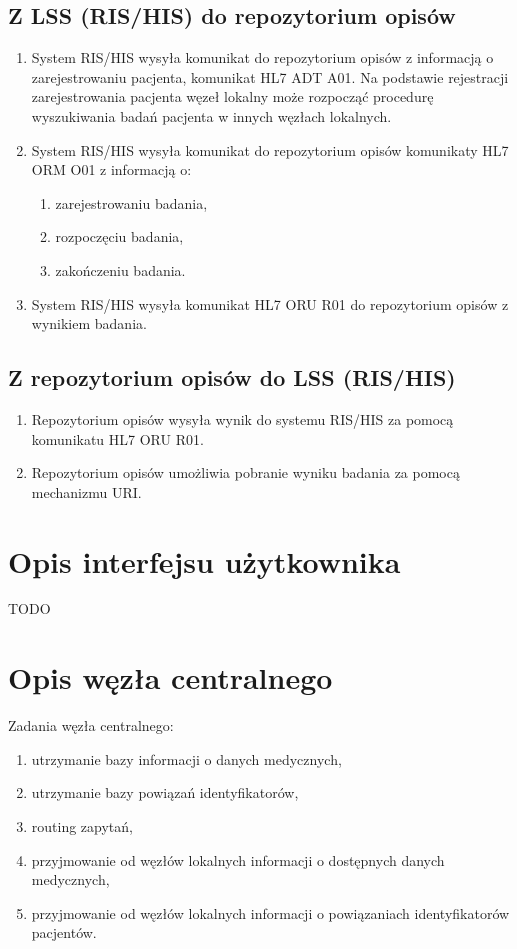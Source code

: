 \documentclass[a4paper]{report}
\begin{document}
\subsection{Z LSS (RIS/HIS) do repozytorium opisów}

\begin{enumerate}
  \item System RIS/HIS wysyła komunikat do repozytorium opisów z informacją o zarejestrowaniu pacjenta, komunikat HL7 ADT A01. Na podstawie rejestracji zarejestrowania pacjenta węzeł lokalny może rozpocząć procedurę wyszukiwania badań pacjenta w innych węzłach lokalnych.
  \item System RIS/HIS wysyła komunikat do repozytorium opisów komunikaty HL7 ORM O01 z informacją o:
    \begin{enumerate}
      \item zarejestrowaniu badania,
      \item rozpoczęciu badania,
      \item zakończeniu badania.
    \end{enumerate}
  \item System RIS/HIS wysyła komunikat HL7 ORU R01 do repozytorium opisów z wynikiem badania.
\end{enumerate}

\subsection{Z repozytorium opisów do LSS (RIS/HIS)}

\begin{enumerate}
  \item Repozytorium opisów wysyła wynik do systemu RIS/HIS za pomocą komunikatu HL7 ORU R01.
  \item Repozytorium opisów umożliwia pobranie wyniku badania za pomocą mechanizmu URI.
\end{enumerate}


\section{Opis interfejsu użytkownika}

TODO

\section{Opis węzła centralnego}

Zadania węzła centralnego:
  \begin{enumerate}
    \item utrzymanie bazy informacji o danych medycznych,
    \item utrzymanie bazy powiązań identyfikatorów,
    \item routing zapytań,
    \item przyjmowanie od węzłów lokalnych informacji o dostępnych danych medycznych,
    \item przyjmowanie od węzłów lokalnych informacji o powiązaniach identyfikatorów pacjentów.
  \end{enumerate}
\end{document}
